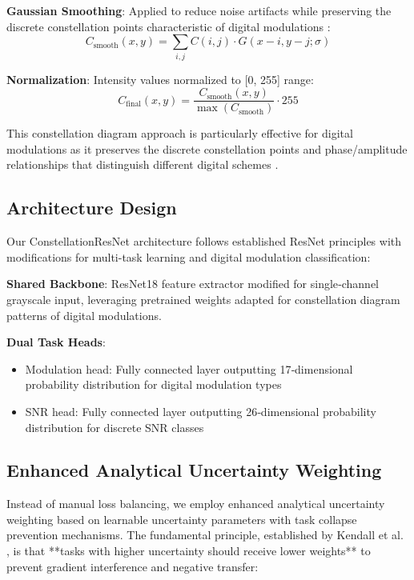 \documentclass{ELSP}
\begin{document}
\textbf{Gaussian Smoothing}: Applied to reduce noise artifacts while preserving the discrete constellation points characteristic of digital modulations \cite{sun2022amc}:
\begin{equation}
C_{\text{smooth}}(x,y) = \sum_{i,j} C(i,j) \cdot G(x-i, y-j; \sigma)
\end{equation}

\textbf{Normalization}: Intensity values normalized to [0, 255] range:
\begin{equation}
C_{\text{final}}(x,y) = \frac{C_{\text{smooth}}(x,y)}{\max(C_{\text{smooth}})} \cdot 255
\end{equation}

This constellation diagram approach is particularly effective for digital modulations as it preserves the discrete constellation points and phase/amplitude relationships that distinguish different digital schemes \cite{peng2021survey,sun2023novel}.

\subsection{Architecture Design}

Our ConstellationResNet architecture follows established ResNet principles \cite{kumar2023automatic} with modifications for multi-task learning and digital modulation classification:

\textbf{Shared Backbone}: ResNet18 feature extractor modified for single‑channel grayscale input, leveraging pretrained weights adapted for constellation diagram patterns of digital modulations.

\textbf{Dual Task Heads}: 
\begin{itemize}
\item Modulation head: Fully connected layer outputting 17‑dimensional probability distribution for digital modulation types
\item SNR head: Fully connected layer outputting 26‑dimensional probability distribution for discrete SNR classes
\end{itemize}

\subsection{Enhanced Analytical Uncertainty Weighting}

Instead of manual loss balancing, we employ enhanced analytical uncertainty weighting \cite{liu2024analytical} based on learnable uncertainty parameters with task collapse prevention mechanisms. The fundamental principle, established by Kendall et al. \cite{kendall2018multi}, is that **tasks with higher uncertainty should receive lower weights** to prevent gradient interference and negative transfer:
\end{document}

